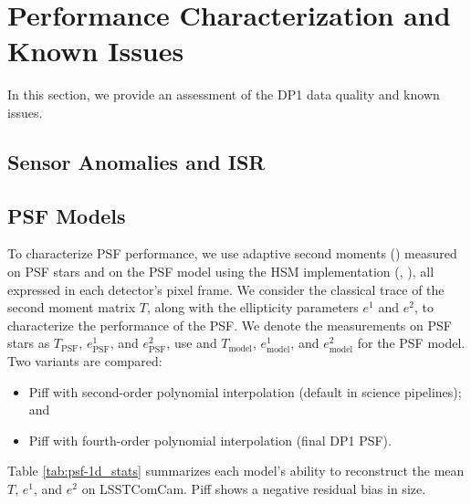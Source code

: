 \section{Performance Characterization and Known Issues
\label{sec:performance}}
%
In this section, we provide an assessment of the \gls{DP1} data quality and known issues.
%

\subsection{Sensor Anomalies and ISR}
\label{ssec:sensor_anomalies}

 

\subsection{PSF Models
\label{ssec:psf_models}}
To characterize \gls{PSF} performance, we use adaptive second moments (\citealt{2002AJ....123..583B})
measured on \gls{PSF} stars and on the PSF model using the \gls{HSM} 
implementation (\citealt{2003MNRAS.343..459H}, \citealt{2005MNRAS.361.1287M}), 
all expressed in each detector's pixel frame.
We consider the classical trace of the second moment matrix $T$, along with the ellipticity parameters $e^1$ and $e^2$, to characterize the performance of the PSF.
We denote the measurements on \gls{PSF} stars as $T_{\text{PSF}}$, $e^1_{\text{PSF}}$, and $e^2_{\text{PSF}}$, use and $T_{\text{model}}$, $e^1_{\text{model}}$, and $e^2_{\text{model}}$ for the \gls{PSF} model. Two variants are compared:
\begin{itemize}
\item Piff with second-order polynomial interpolation (default in science pipelines); and
\item Piff with fourth-order polynomial interpolation (final \gls{DP1} \gls{PSF}).
\end{itemize}

Table \ref{tab:psf-1d_stats} summarizes each model’s ability to reconstruct
the mean $T$, $e^1$, and $e^2$ on  \gls{LSSTComCam}. Piff shows a negative
residual bias in size. 



